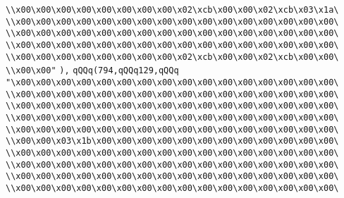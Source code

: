 \verb|\\x00\x00\x00\x00\x00\x00\x00\x00\x02\xcb\x00\x00\x02\xcb\x03\x1a\|\newline
\verb|\\x00\x00\x00\x00\x00\x00\x00\x00\x00\x00\x00\x00\x00\x00\x00\x00\|\newline
\verb|\\x00\x00\x00\x00\x00\x00\x00\x00\x00\x00\x00\x00\x00\x00\x00\x00\|\newline
\verb|\\x00\x00\x00\x00\x00\x00\x00\x00\x00\x00\x00\x00\x00\x00\x00\x00\|\newline
\verb|\\x00\x00\x00\x00\x00\x00\x00\x00\x02\xcb\x00\x00\x02\xcb\x00\x00\|\newline
\verb|\\x00\x00"|\newline
\verb|),|\newline
\verb|qQQq(794,qQQq129,qQQq|\newline
\verb|"\x00\x00\x00\x00\x00\x00\x00\x00\x00\x00\x00\x00\x00\x00\x00\x00\|\newline
\verb|\\x00\x00\x00\x00\x00\x00\x00\x00\x00\x00\x00\x00\x00\x00\x00\x00\|\newline
\verb|\\x00\x00\x00\x00\x00\x00\x00\x00\x00\x00\x00\x00\x00\x00\x00\x00\|\newline
\verb|\\x00\x00\x00\x00\x00\x00\x00\x00\x00\x00\x00\x00\x00\x00\x00\x00\|\newline
\verb|\\x00\x00\x00\x00\x00\x00\x00\x00\x00\x00\x00\x00\x00\x00\x00\x00\|\newline
\verb|\\x00\x00\x03\x1b\x00\x00\x00\x00\x00\x00\x00\x00\x00\x00\x00\x00\|\newline
\verb|\\x00\x00\x00\x00\x00\x00\x00\x00\x00\x00\x00\x00\x00\x00\x00\x00\|\newline
\verb|\\x00\x00\x00\x00\x00\x00\x00\x00\x00\x00\x00\x00\x00\x00\x00\x00\|\newline
\verb|\\x00\x00\x00\x00\x00\x00\x00\x00\x00\x00\x00\x00\x00\x00\x00\x00\|\newline
\verb|\\x00\x00\x00\x00\x00\x00\x00\x00\x00\x00\x00\x00\x00\x00\x00\x00\|\newline
